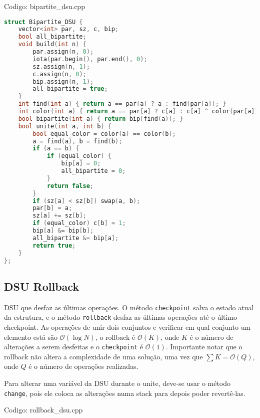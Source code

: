 \documentclass[10pt, a4paper, oneside]{book}
\begin{document}
\hfill

Codigo: bipartite\_dsu.cpp

\begin{lstlisting}[language=C++]
struct Bipartite_DSU {
    vector<int> par, sz, c, bip;
    bool all_bipartite;
    void build(int n) {
        par.assign(n, 0);
        iota(par.begin(), par.end(), 0);
        sz.assign(n, 1);
        c.assign(n, 0);
        bip.assign(n, 1);
        all_bipartite = true;
    }
    int find(int a) { return a == par[a] ? a : find(par[a]); }
    int color(int a) { return a == par[a] ? c[a] : c[a] ^ color(par[a]); }
    bool bipartite(int a) { return bip[find(a)]; }
    bool unite(int a, int b) {
        bool equal_color = color(a) == color(b);
        a = find(a), b = find(b);
        if (a == b) {
            if (equal_color) {
                bip[a] = 0;
                all_bipartite = 0;
            }
            return false;
        }
        if (sz[a] < sz[b]) swap(a, b);
        par[b] = a;
        sz[a] += sz[b];
        if (equal_color) c[b] = 1;
        bip[a] &= bip[b];
        all_bipartite &= bip[a];
        return true;
    }
};
\end{lstlisting}
\hfill

\subsection{DSU Rollback}


DSU que desfaz as últimas operações. O método \texttt{checkpoint} salva o estado atual da estrutura, e o método \texttt{rollback} desfaz as últimas operações até o último checkpoint. As operações de unir dois conjuntos e verificar em qual conjunto um elemento está são $\mathcal{O}(\log N)$, o rollback é $\mathcal{O}(K)$, onde $K$ é o número de alterações a serem desfeitas e o \texttt{checkpoint} é $\mathcal{O}(1)$. Importante notar que o rollback não altera a complexidade de uma solução, uma vez que $\sum K = \mathcal{O}(Q)$, onde $Q$ é o número de operações realizadas.



Para alterar uma variável da DSU durante o unite, deve-se usar o método \texttt{change}, pois ele coloca as alterações numa stack para depois poder revertê-las.
\hfill

Codigo: rollback\_dsu.cpp
\end{document}
